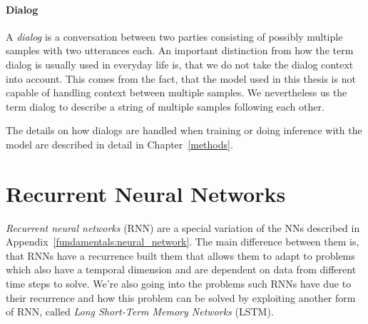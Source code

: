 \paragraph{Dialog} A \emph{dialog} is a conversation between two parties consisting of possibly multiple samples with two utterances each. An important distinction from how the term dialog is usually used in everyday life is, that we do not take the dialog context into account. This comes from the fact, that the model used in this thesis is not capable of handling context between multiple samples. We nevertheless us the term dialog to describe a string of multiple samples following each other.

The details on how dialogs are handled when training or doing inference with the model are described in detail in Chapter~\ref{methods}.

\section{Recurrent Neural Networks}
\emph{Recurrent neural networks} (RNN) are a special variation of the NNs described in Appendix~\ref{fundamentals:neural_network}. The main difference between them is, that RNNs have a recurrence built them that allows them to adapt to problems which also have a temporal dimension and are dependent on data from different time steps to solve. We're also going into the problems such RNNs have due to their recurrence and how this problem can be solved by exploiting another form of RNN, called \emph{Long Short-Term Memory Networks} (LSTM).

